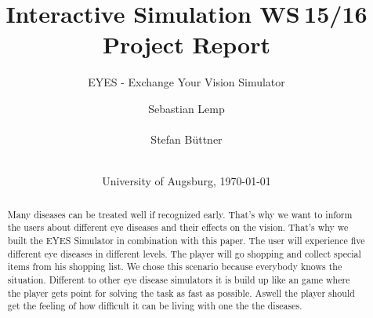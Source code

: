 \documentclass{sig-alternate-05-2015}
\begin{document}
\title{
Interactive Simulation WS 15/16\\ %
Project Report
}
\subtitle{EYES - Exchange Your Vision Simulator}
\author{
\alignauthor
Sebastian Lemp\\
       \\
\alignauthor
Stefan Büttner\\
       \\
}

\date{University of Augsburg, \today}




\maketitle
\begin{abstract}
Many diseases can be treated well if recognized early.
That's why we want to inform the users about different eye diseases and their effects on the vision.
That's why we built the EYES Simulator in combination with this paper.
The user will experience five different eye diseases in different levels.
The player will go shopping and collect special items from his shopping list.
We chose this scenario because everybody knows the situation.
Different to other eye disease simulators it is build up like an game where the player gets point for solving the task as fast as possible. Aswell the player should get the feeling of how difficult it can be living with one the the diseases.

\end{abstract}
\end{document}
